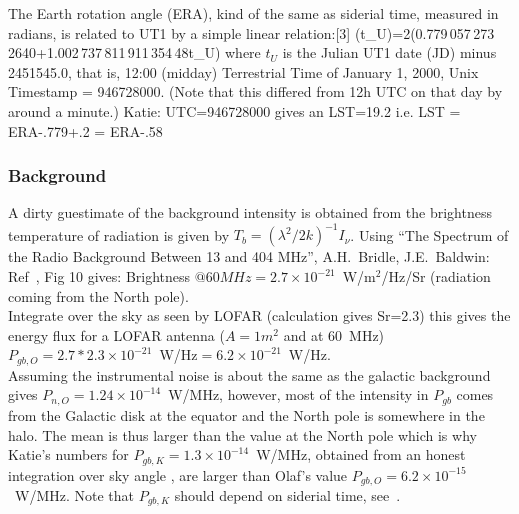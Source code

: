 {The Earth rotation angle (ERA), kind of the same as siderial time, measured in radians, is related to UT1 by a simple linear relation:[3]
\beq  \theta (t_{U})=2\pi (0.779\,057\,273\,2640+1.002\,737\,811\,911\,354\,48\cdot t_{U})
\eeq
where $t_U$ is the Julian UT1 date (JD) minus 2451545.0, that is, 12:00 (midday) Terrestrial Time of January 1, 2000, Unix Timestamp = 946728000. (Note that this differed from 12h UTC on that day by around a minute.)
Katie:  UTC=946728000 gives an LST=19.2 i.e. LST = ERA-.779+.2 = ERA-.58
} %

\subsubsection{Background}

A dirty guestimate of the background intensity is obtained from the brightness temperature of radiation is given by $T_b = (\lambda^2 / 2k)^{-1} I_\nu$.
Using  ``The Spectrum of the Radio Background Between 13 and 404 MHz'',
A.H.\ Bridle, J.E.\ Baldwin:%
\\Ref~\cite{Bridle:1967}, Fig 10 gives: Brightness $ @60MHz=2.7\times 10^{-21}$~W/m$^2$/Hz/Sr (radiation coming from the North pole).
\\Integrate over the sky as seen by LOFAR (calculation gives Sr=2.3) this gives the energy flux for a LOFAR antenna ($A=1 m^2$ and at 60~MHz) $P_{gb,O}=2.7*2.3\times 10^{-21}$~W/Hz$=6.2\times 10^{-21}$~W/Hz.
\\Assuming the instrumental noise is about the same as the galactic background gives $P_{n,O}=1.24\times 10^{-14}$~W/MHz, however, most of the intensity in $P_{gb}$ comes from the Galactic disk at the equator and the North pole is somewhere in the halo. The mean is thus larger than the value at the North pole which is why Katie's numbers for $P_{gb,K}=1.3\times 10^{-14}$~W/MHz, obtained from an honest integration over sky angle , are larger than Olaf's value $P_{gb,O}=6.2\times 10^{-15}$~W/MHz. Note that $P_{gb,K}$ should depend on siderial time, see~\cite{Mulrey:2019}.


